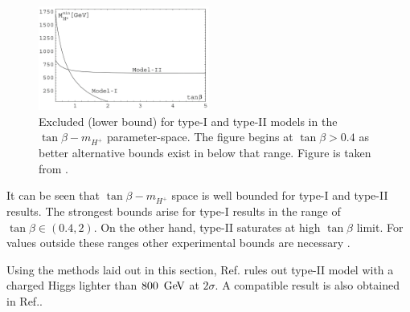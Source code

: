 \begin{figure}[htbp!]
    \centering
        \includegraphics[width=0.5\textwidth]{figures/theory/xsgamma_2hdm_both_types.png}
    \caption{\label{fig:2hdm_limits} 
    Excluded (lower bound) for type-I and type-II \TwoHDM models in the $\tan\beta-m_{H^+}$ parameter-space.
    The figure begins at $\tan\beta>0.4$ as better alternative bounds exist in below that range.
    Figure is taken from \cite{Misiak:2017bgg}.}
\end{figure}

It can be seen that $\tan\beta-m_{H^+}$ space is well bounded for type-I and type-II \TwoHDM results.
The strongest bounds arise for type-I \TwoHDM results in the range of $\tan\beta\in(0.4,2)$.
On the other hand, type-II \TwoHDM saturates at high $\tan\beta$ limit.
For values outside these ranges other experimental bounds are necessary \cite{Misiak:2017bgg}.

Using the methods laid out in this section, Ref.\cite{Misiak:2020vlo} rules out type-II \TwoHDM model with a charged Higgs lighter than $800~\mathrm{\,Ge\kern -0.1em V}$ at $2\sigma$.
A compatible result is also obtained in Ref.\cite{Atkinson:2021eox}.